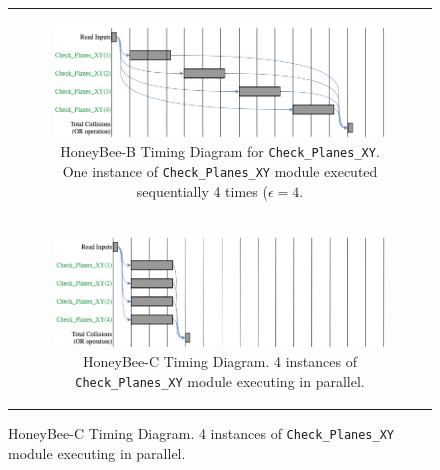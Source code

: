 \begin{figure}[H]
\begin{centering}
\begin{tabular}{c}

\begin{subfigure}{\linewidth}
\includegraphics[width=\linewidth]{chapters/chapter3/img/timing3.png}
\caption{HoneyBee-B Timing Diagram for \texttt{Check\_Planes\_XY}. One instance of \texttt{Check\_Planes\_XY} module executed sequentially 4 times ($\epsilon=4$.}
\label{fig:hbb_timing_a}
\end{subfigure} \\

\begin{subfigure}{\linewidth}
\includegraphics[width=\linewidth]{chapters/chapter3/img/timing4.png}
\caption{HoneyBee-C Timing Diagram. 4 instances of \texttt{Check\_Planes\_XY} module executing in parallel.}
\label{fig:hbb_timing_b}
\end{subfigure} \\

\end{tabular}
\label{fig:hbb_timing}
\end{centering}
\end{figure}